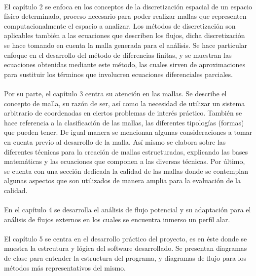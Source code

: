 \documentclass[letterpaper, openright, 12pt]{book}
\begin{document}
    \paragraph*{}
    El capítulo 2 se enfoca en los conceptos de la discretización espacial de un
    espacio físico determinado, proceso necesario para poder realizar mallas que
    representen computacionalmente el espacio a analizar. Los métodos de
    discretización son aplicables también a las ecuaciones que describen los
    flujos, dicha discretización se hace tomando en cuenta la malla generada
    para el análisis. Se hace particular enfoque en el desarrollo del método de
    diferencias finitas, y se muestran las ecuaciones obtenidas mediante este
    método, las cuales sirven de aproximaciones para sustituir los términos que
    involucren ecuaciones diferenciales parciales.

    \paragraph*{}
    Por su parte, el capítulo 3 centra su atención en las mallas. Se describe el
    concepto de malla, su razón de ser, así como la necesidad de utilizar un
    sistema arbitrario de coordenadas en ciertos problemas de interés práctico.
    También se hace referencia a la clasificación de las mallas, las diferentes
    tipologías (formas) que pueden tener. De igual manera se mencionan algunas
    consideraciones a tomar en cuenta previo al desarrollo de la malla. Así
    mismo se elabora sobre las diferentes técnicas para la creación de mallas
    estructuradas, explicando las bases matemáticas y las ecuaciones que
    componen a las diversas técnicas. Por último, se cuenta con una sección
    dedicada la calidad de las mallas donde se contemplan algunas aspectos que
    son utilizados de manera amplia para la evaluación de la calidad.

    \paragraph*{}
    En el capítulo 4 se desarrolla el análisis de flujo potencial y su
    adaptación para el análisis de flujos externos en los cuales se encuentra
    inmerso un perfil alar.

    \paragraph*{}
    El capítulo 5 se centra en el desarrollo práctico del proyecto, es en éste
    donde se muestra la estrcutura y lógica del software desarrollado. Se
    presentan diagramas de clase para entender la estructura del programa, y
    diagramas de flujo para los métodos más representativos del mismo.
\end{document}
